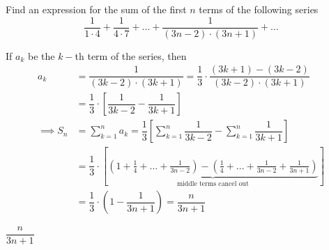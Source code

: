 

\question[3] Find an expression for the sum of the first $n$ terms of the following series
\[ \dfrac{1}{1\cdot 4} + \dfrac{1}{4\cdot 7} + \ldots + \dfrac{1}{(3n-2)\cdot(3n+1)} + \ldots \]

\begin{solution}[\halfpage]
  If $a_k$ be the $k-$th term of the series, then 
  \begin{align}
     a_k &= \dfrac{1}{(3k-2)\cdot (3k+1)} = \dfrac{1}{3}\cdot\dfrac{(3k+1)-(3k-2)}{(3k-2)\cdot(3k+1)} \\
     & = \dfrac{1}{3}\cdot\left[ \dfrac{1}{3k-2}-\dfrac{1}{3k+1} \right] \\
		\implies S_n &= \sum_{k=1}^n a_k = \dfrac{1}{3}\left[ \sum_{k=1}^{n}\dfrac{1}{3k-2} - \sum_{k=1}^{n}\dfrac{1}{3k+1}\right] \\
		    &= \dfrac{1}{3}\cdot\left[\underbrace{\left( 1+\frac{1}{4}+\ldots +\frac{1}{3n-2}\right)
		    - \left( \frac{1}{4} + \ldots + \frac{1}{3n-2} + \frac{1}{3n+1}\right)}_{\text{middle terms cancel out}} \right] \\
		    &= \dfrac{1}{3}\cdot\left( 1-\dfrac{1}{3n+1}\right) = \dfrac{n}{3n+1}
	\end{align}
\end{solution}
\ifprintanswers\begin{codex}$\dfrac{n}{3n+1}$\end{codex}\fi

